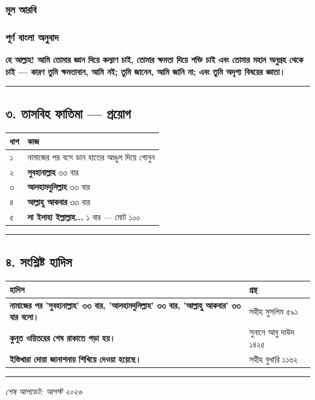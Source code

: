 \subsubsection*{মূল আরবি}
\begin{center}\end{center}

\subsubsection*{পূর্ণ বাংলা অনুবাদ}
\textbf{হে আল্লাহ! আমি তোমার জ্ঞান দিয়ে কল্যাণ চাই, তোমার ক্ষমতা দিয়ে শক্তি চাই এবং তোমার মহান অনুগ্রহ থেকে চাই — কারণ তুমি ক্ষমতাবান, আমি নই; তুমি জানেন, আমি জানি না; এবং তুমি অদৃশ্য বিষয়ের জ্ঞাতা।}

\medskip\hrule\medskip

\subsection*{৩. তাসবিহ ফাতিমা — প্রয়োগ}

\begin{table}[h]\centering\small
\begin{tabular}{ll}
ধাপ & কাজ \\
\hline
১ & নামাজের পর বসে ডান হাতের আঙুল দিয়ে গোনুন \\
২ & \textbf{সুবহানাল্লাহ} ৩৩ বার \\
৩ & \textbf{আলহামদুলিল্লাহ} ৩৩ বার \\
৪ & \textbf{আল্লাহু আকবার} ৩৩ বার \\
৫ & \textbf{লা ইলাহা ইল্লাল্লাহ...} ১ বার — মোট ১০০ \\
\hline
\end{tabular}
\end{table}

\medskip\hrule\medskip

\subsection*{৪. সংশ্লিষ্ট হাদিস}

\begin{table}[h]\centering\small
\begin{tabular}{ll}
হাদিস & গ্রন্থ \\
\hline
\textbf{\lat{“}নামাজের পর 'সুবহানাল্লাহ' ৩৩ বার, 'আলহামদুলিল্লাহ' ৩৩ বার, 'আল্লাহু আকবার' ৩৩ বার বলো।\lat{”}} & সহীহ মুসলিম ৫৯১ \\
\textbf{\lat{“}কুনূত ওয়িতরের শেষ রাকাতে পড়া হয়।\lat{”}} & সুনানে আবু দাউদ ১৪২৫ \\
\textbf{\lat{“}ইস্তিখারা দোয়া জানাশনায় শিখিয়ে দেওয়া হয়েছে।\lat{”}} & সহীহ বুখারি ১১৬২ \\
\hline
\end{tabular}
\end{table}

\medskip\hrule\medskip

\textit{শেষ আপডেট: আগস্ট ২০২৬}



